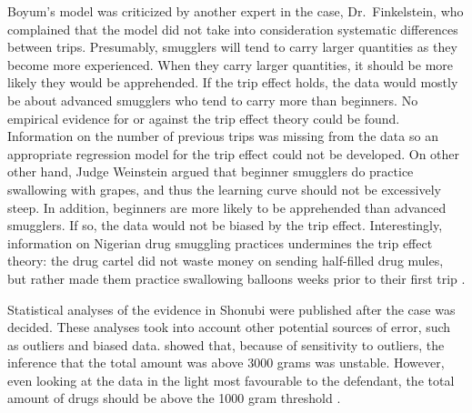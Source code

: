 \documentclass{article}
\begin{document}
 Boyum's model was criticized by another expert in the case, Dr.\ Finkelstein, who complained that the model did not take into consideration  systematic differences between trips. Presumably, smugglers will tend to carry larger quantities as they become more experienced. When they carry larger quantities, it should be more likely they would be apprehended. If the trip effect holds, the data would mostly be about advanced smugglers who tend to carry more than beginners.  No empirical evidence for or against the trip effect theory could be found. Information on the number of previous trips was missing from the data so an appropriate regression model for the trip effect could not be developed. 
  On other other hand, Judge Weinstein argued that beginner smugglers do practice swallowing with grapes, and thus the learning curve should not be excessively steep. In addition, beginners are more likely to be apprehended than advanced smugglers. If so, the data would not be biased by the trip effect. Interestingly, information on Nigerian drug smuggling practices undermines the trip effect theory:  the drug cartel did not waste money on sending half-filled drug mules, but rather made them practice swallowing balloons weeks prior to their first trip \citep{Treaser1992,Wren1999pipeline}. %

    
     Statistical analyses of the evidence in Shonubi were published after the case was decided.
     These analyses took into account other potential sources of error, such as outliers and biased data. 
     \citet{gastwirth2000shonubi} showed that, because of sensitivity to outliers, %
     the inference that the total amount was above 3000 grams was unstable. 
		 	 However, even looking at the data in the light most favourable to the defendant, the total amount of drugs should be above the 1000 gram threshold  \citep{izenman2000introduction,gastwirth2000shonubi,izenman2000assessing}. 
	 
	 
\end{document}
